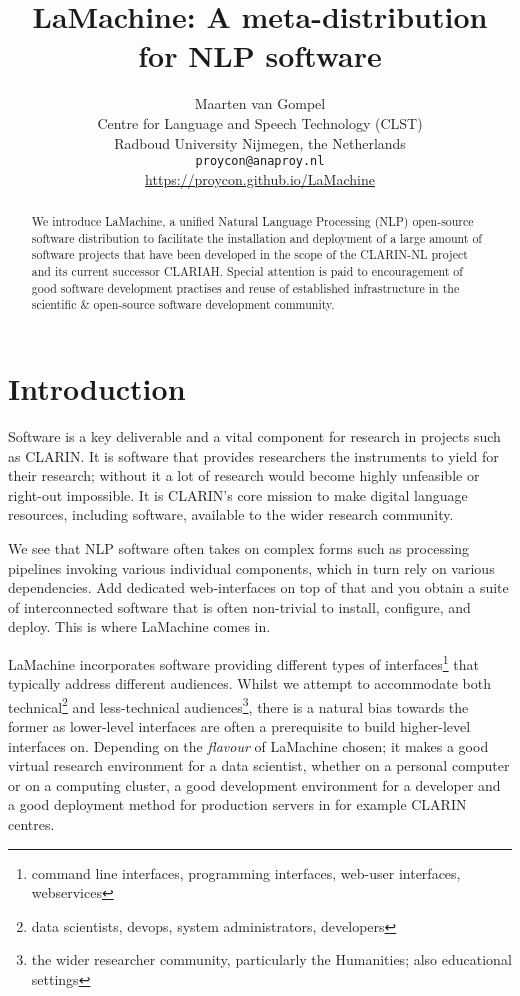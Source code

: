 \documentclass[a4paper,11pt]{article}
\title{LaMachine: A meta-distribution for NLP software}
\author{Maarten van Gompel \\
  Centre for Language and Speech Technology (CLST) \\
  Radboud University Nijmegen, the Netherlands \\
  {\tt proycon@anaproy.nl} \\ %
  \url{https://proycon.github.io/LaMachine}
}
\date{}
\begin{document}
\maketitle

\begin{abstract}
We introduce LaMachine, a unified Natural Language Processing (NLP) open-source software distribution to facilitate the
installation and deployment of a large amount of software projects that have been developed in the scope of the
CLARIN-NL project and its current successor CLARIAH. Special attention is paid to encouragement of good software
development practises and reuse of established infrastructure in the scientific \& open-source software development
community.
\end{abstract}

\section{Introduction} \label{intro}

Software is a key deliverable and a vital component for research in projects such as CLARIN. It is software that
provides researchers the instruments to yield for their research; without it a lot of research would become highly
unfeasible or right-out impossible. It is CLARIN's core mission to make digital language resources, including software,
available to the wider research community.

We see that NLP software often takes on complex forms such as processing pipelines invoking various individual
components, which in turn rely on various dependencies. Add dedicated web-interfaces on top of that and you obtain a
suite of interconnected software that is often non-trivial to install, configure, and deploy. This is where LaMachine
comes in.

LaMachine incorporates software providing different types of interfaces\footnote{command line interfaces, programming
interfaces, web-user interfaces, webservices} that typically address different audiences. Whilst we attempt to
accommodate both technical\footnote{data scientists, devops, system administrators, developers} and less-technical
audiences\footnote{the wider researcher community, particularly the Humanities; also educational settings}, there is a natural bias towards the former as
lower-level interfaces are often a prerequisite to build higher-level interfaces on. Depending on the \emph{flavour} of
LaMachine chosen; it makes a good virtual research environment for a data scientist, whether on a personal computer or on a computing
cluster, a good development environment for a developer and a good deployment method for production servers in for
example CLARIN centres.
\end{document}
